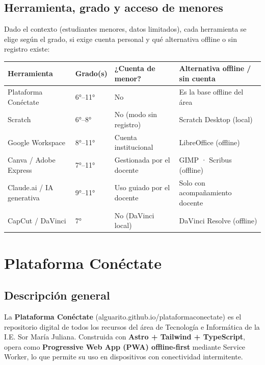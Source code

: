 \documentclass[12pt, a4paper]{article}
\begin{document}
\subsection{Herramienta, grado y acceso de menores}

Dado el contexto (estudiantes menores, datos limitados), cada herramienta se elige
según el grado, si exige cuenta personal y qué alternativa offline o sin registro
existe:

\begin{center}
\footnotesize
\setlength{\tabcolsep}{4pt}
\begin{tabular}{|L{3.4cm}|L{1.8cm}|L{3.2cm}|L{4cm}|}
\hline
{}
\color{white}\textbf{Herramienta} &
\color{white}\textbf{Grado(s)} &
\color{white}\textbf{¿Cuenta de menor?} &
\color{white}\textbf{Alternativa offline / sin cuenta} \\
\hline
Plataforma Conéctate & 6°–11° & No & Es la base offline del área \\
\hline
Scratch & 6°–8° & No (modo sin registro) & Scratch Desktop (local) \\
\hline
Google Workspace & 8°–11° & Cuenta institucional & LibreOffice (offline) \\
\hline
Canva / Adobe Express & 7°–11° & Gestionada por el docente & GIMP · Scribus (offline) \\
\hline
Claude.ai / IA generativa & 9°–11° & Uso guiado por el docente & Solo con acompañamiento docente \\
\hline
CapCut / DaVinci & 7° & No (DaVinci local) & DaVinci Resolve (offline) \\
\hline
\end{tabular}
\end{center}

\section{Plataforma Conéctate}

\subsection{Descripción general}

La \textbf{Plataforma Conéctate} (alguarito.github.io/plataformaconectate) es el
repositorio digital de todos los recursos del área de Tecnología e Informática
de la I.E. Sor María Juliana. Construida con \textbf{Astro + Tailwind + TypeScript},
opera como \textbf{Progressive Web App (PWA) offline-first} mediante Service Worker,
lo que permite su uso en dispositivos con conectividad intermitente.
\end{document}
